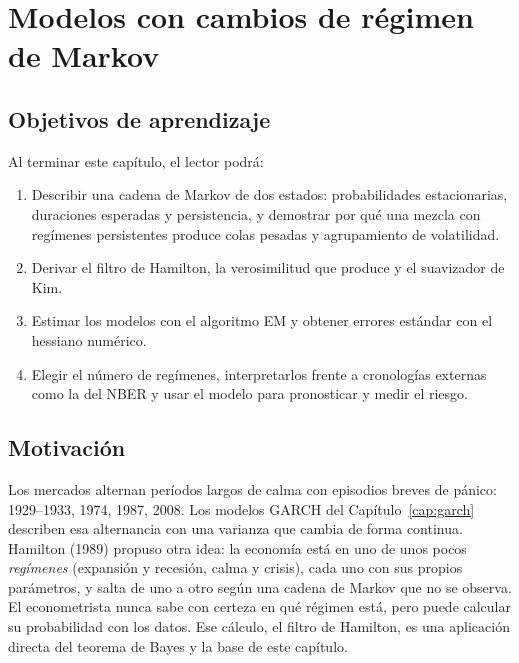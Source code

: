 \chapter[Cambios de régimen de Markov]{Modelos con cambios de régimen de Markov}\label{cap:markov}

\section*{Objetivos de aprendizaje}
Al terminar este capítulo, el lector podrá:
\begin{enumerate}[label=\arabic*.,leftmargin=*]
  \item Describir una cadena de Markov de dos estados: probabilidades estacionarias, duraciones esperadas y
        persistencia, y demostrar por qué una mezcla con regímenes persistentes produce colas pesadas y
        agrupamiento de volatilidad.
  \item Derivar el filtro de Hamilton, la verosimilitud que produce y el suavizador de Kim.
  \item Estimar los modelos con el algoritmo EM y obtener errores estándar con el hessiano numérico.
  \item Elegir el número de regímenes, interpretarlos frente a cronologías externas como la del NBER y usar el
        modelo para pronosticar y medir el riesgo.
\end{enumerate}

\section*{Motivación}
Los mercados alternan períodos largos de calma con episodios breves de pánico: 1929--1933, 1974, 1987, 2008. Los
modelos GARCH del Capítulo~\ref{cap:garch} describen esa alternancia con una varianza que cambia de forma continua.
Hamilton (1989) propuso otra idea: la economía está en uno de unos pocos \emph{regímenes} (expansión y recesión,
calma y crisis), cada uno con sus propios parámetros, y salta de uno a otro según una cadena de Markov que no se
observa. El econometrista nunca sabe con certeza en qué régimen está, pero puede calcular su probabilidad con los
datos. Ese cálculo, el filtro de Hamilton, es una aplicación directa del teorema de Bayes y la base de este capítulo.

